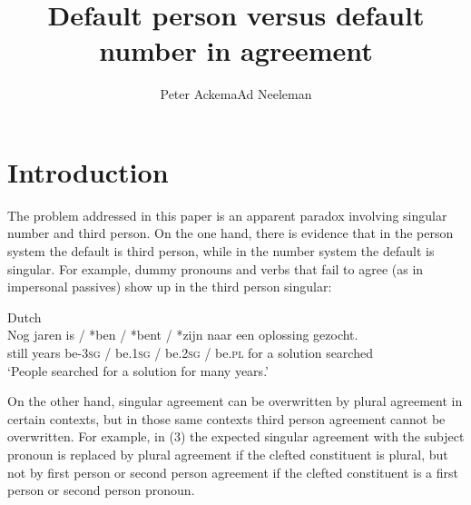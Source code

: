 \documentclass[output=paper]{langsci/langscibook}
\title{Default person versus default number in agreement}
\author{Peter Ackema\affiliation{University of Edinburgh}\lastand Ad Neeleman\affiliation{UCL}}
\begin{document}
 

 

 

 

 

\section{Introduction}

The problem addressed in this paper is an apparent paradox involving singular number and third person. On the one hand, there is evidence that in the person system the default is third person, while in the number system the default is singular. For example, dummy pronouns and verbs that fail to agree (as in impersonal passives) show up in the third person singular:

\ea 
  \z
\z

\ea Dutch \\
\gll Nog  jaren  is / *ben / *bent / *zijn              naar een oplossing gezocht.\\
  still years  be-\textsc{3sg} / be.\textsc{1sg} / be.\textsc{2sg} / be.\textsc{pl} for   a    solution   searched\\
\glt ‘People searched for a solution for many years.’
\z

On the other hand, singular agreement can be overwritten by plural agreement in certain contexts, but in those same contexts third person agreement cannot be overwritten. For example, in (3) the expected singular agreement with the subject pronoun is replaced by plural agreement if the clefted constituent is plural, but not by first person or second person agreement if the clefted constituent is a first person or second person pronoun.
\end{document}
